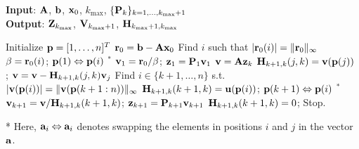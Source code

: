 \documentclass[11pt]{article}
\numberwithin{equation}{section}
\newcommand{\bfA}{{\bf A}}
\newcommand{\bfH}{{\bf H}}
\newcommand{\bfP}{{\bf P}}
\newcommand{\bfV}{{\bf V}}
\newcommand{\bfZ}{{\bf Z}}
\newcommand{\bfa}{{\bf a}}
\newcommand{\bfb}{{\bf b}}
\newcommand{\bfp}{{\bf p}}
\newcommand{\bfr}{{\bf r}}
\newcommand{\bfu}{{\bf u}}
\newcommand{\bfv}{{\bf v}}
\newcommand{\bfx}{{\bf x}}
\newcommand{\bfz}{{\bf z}}
\begin{document}
\begin{algorithm}[ht]
\caption{Flexible Hessenberg process with pivoting} \label{alg:Hessenberg}
\hspace*{\algorithmicindent} \textbf{Input}: $\bfA$, $\bfb$, $\bfx_0$, $k_{\max}$, $\{\bfP_{k}\}_{k=1,\dots,k_{\max}+1}$\\
\hspace*{\algorithmicindent} \textbf{Output}: $\bfZ_{k_{\max}}$, $\bfV_{k_{\max}+1}$, $\bfH_{k_{\max}+1,k_{\max}}$
\begin{algorithmic}[1]
\State Initialize $\bfp = [1, \dots, n]^{T}$
\State $\bfr_0=\bfb - \bfA\bfx_0$ 
\State Find $i$ such that $|\bfr_0(i)| = \|\bfr_0\|_{\infty}$
\State $\beta = \bfr_0(i)$; $\bfp(1) \Leftrightarrow \bfp(i)$ $^*$
\State $ \bfv_1 = \bfr_0/ \beta$; $ \bfz_1 = \bfP_1 \bfv_1$
\State $\bfv = \bfA \bfz_k$
\State $\bfH_{k+1,k}(j,k) = \bfv(\bfp(j))$ ; $\bfv = \bfv - \bfH_{k+1,k}(j,k) \bfv_j$
\EndFor
\If{$k < n$ and $\bfu \neq \bf0$}
\State Find $i \in \{k+1, \dots, n\}$ s.t. $|\bfv(\bfp(i))| = \| \bfv(\bfp(k+1:n)) \|_{\infty}$
\State $\bfH_{k+1,k}(k+1,k) = \bfu(\bfp(i))$; $\bfp(k+1) \Leftrightarrow \bfp(i)$ $^*$
\State $\bfv_{k+1} = \bfv/ \bfH_{k+1,k}(k+1,k) $; $ \bfz_{k+1} = \bfP_{k+1} \bfv_{k+1}$
\Else
\State $\bfH_{k+1,k}(k+1,k) = 0$; Stop.
\EndIf
\EndFor
\end{algorithmic} 
\vspace{-3pt}
\begin{footnotesize}
* Here, $\bfa_i \Leftrightarrow \bfa_i$ denotes swapping the elements in positions $i$ and $j$ in the vector $\bfa$.
\end{footnotesize}
\end{algorithm} 
\end{document}
